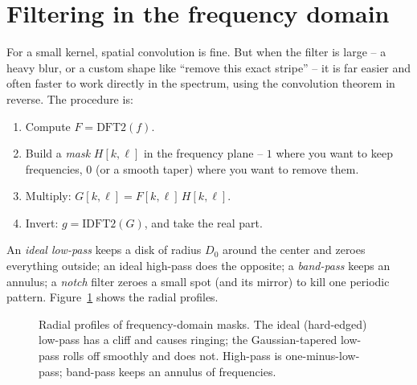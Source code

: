 \section{Filtering in the frequency domain}
\label{ch31:freq-filtering}

For a small kernel, spatial convolution is fine. But when the filter is large -- a
heavy blur, or a custom shape like ``remove this exact stripe'' -- it is far easier
and often faster to work directly in the spectrum, using the convolution theorem
in reverse. The procedure is:

\begin{enumerate}
\item Compute $F = \mathrm{DFT2}(f)$.
\item Build a \emph{mask} $H[k,\ell]$ in the frequency plane -- $1$ where you want to
keep frequencies, $0$ (or a smooth taper) where you want to remove them.
\item Multiply: $G[k,\ell] = F[k,\ell]\,H[k,\ell]$.
\item Invert: $g = \mathrm{IDFT2}(G)$, and take the real part.
\end{enumerate}

An \emph{ideal low-pass} keeps a disk of radius $D_0$ around the center and zeroes
everything outside; an ideal high-pass does the opposite; a \emph{band-pass} keeps
an annulus; a \emph{notch} filter zeroes a small spot (and its mirror) to kill one
periodic pattern. Figure~\ref{ch31:fig-masks} shows the radial profiles.

\begin{figure}[H]
\centering
{}
\caption{Radial profiles of frequency-domain masks. The ideal (hard-edged)
low-pass has a cliff and causes ringing; the Gaussian-tapered low-pass rolls off
smoothly and does not. High-pass is one-minus-low-pass; band-pass keeps an
annulus of frequencies.}
\label{ch31:fig-masks}
\end{figure}

